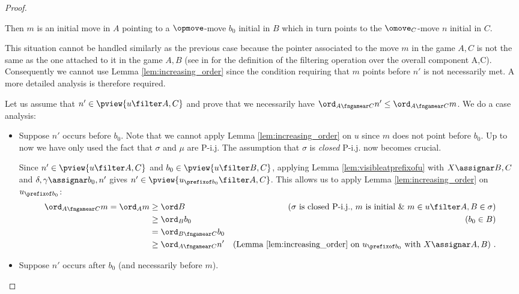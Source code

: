 \begin{proof}
\begin{enumerate}[1)]
        Then $m$ is an initial move in $A$
        pointing to a $\opmove$-move
        $b_0$ initial in $B$ which in turn points to the $\omove_C$-move $n$ initial in $C$.

        This situation cannot be handled similarly as the previous case because the pointer associated to the move $m$ in the game $A,C$ is not the same as the one attached to it in the game $A,B$ (see in \cite{Abr02} for the definition of the  filtering operation over the overall component A,C). Consequently we cannot use Lemma \ref{lem:increasing_order} since the
        condition requiring that $m$ points before $n'$ is not necessarily met. A more detailed analysis is therefore required.

        Let us assume that $n'\in \pview{u\filter A,C}$ and
        prove that we necessarily have $\ord_{A\fngamear C} n' \leq \ord_{A\fngamear C} m$. We do a case analysis:
        \begin{itemize}[-]
        \item Suppose $n'$ occurs before $b_0$.
        Note that we cannot apply Lemma \ref{lem:increasing_order} on $u$
        since $m$ does not point before $b_0$.
        Up to now we have only used the fact that $\sigma$ and $\mu$ are P-i.j. The assumption that $\sigma$ is  \emph{closed} P-i.j. now becomes crucial.

        Since $n' \in \pview{u\filter A,C}$ and
        $b_0 \in \pview{u\filter B,C}$, applying Lemma \ref{lem:visibleatprefixofu}
        with $X\assignar B,C$ and $\delta,\gamma \assignar b_0,n'$ gives
        $n' \in \pview{u_{\prefixof b_0}\filter A,C}$. This allows us to apply Lemma \ref{lem:increasing_order} on $u_{\prefixof b_0}$:
            \begin{align*}
            \ord_{A\fngamear C} m
            = \ord_{A} m
            & \geq \ord B & \mbox{($\sigma$ is closed P-i.j., $m$ is initial \& $ m \in u \filter A,B \in \sigma$)} \\
            & \geq \ord_B b_0 & \mbox{($b_0\in B$)} \\
            & = \ord_{B\fngamear C} b_0  \\
            & \geq \ord_{A\fngamear C} n' & \mbox{(Lemma \ref{lem:increasing_order} on $u_{\prefixof b_0}$ with $X\assignar A,B$)} \ .
            \end{align*}

        \item Suppose $n'$ occurs after $b_0$ (and necessarily before $m$).


\end{itemize}
\end{enumerate}
\end{proof}
